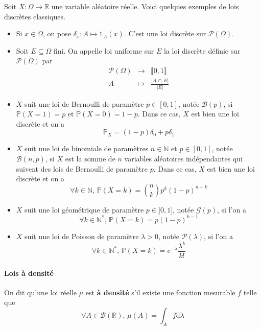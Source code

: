 	
	\begin{example}
		\label{261-1}
		Soit $X : \Omega \rightarrow \mathbb{R}$ une variable aléatoire réelle. Voici quelques exemples de lois discrètes classiques.
		\begin{itemize}
			\item \label{261-2} Si $x \in \Omega$, on pose $\delta_x : A \mapsto \mathbb{1}_A(x)$. C'est une loi discrète sur $\mathcal{P}(\Omega)$.
			\item Soit $E \subseteq \Omega$ fini. On appelle loi uniforme sur $E$ la loi discrète définie sur $\mathcal{P}(\Omega)$ par
			\[
			\begin{array}{ccc}
				\mathcal{P}(\Omega) &\rightarrow& \llbracket 0, 1 \rrbracket \\
				A &\mapsto& \frac{\vert A \, \cap \, E \vert}{\vert E \vert}
			\end{array}
			\]
			\item $X$ suit une loi de Bernoulli de paramètre $p \in [0,1]$, notée $\mathcal{B}(p)$, si $\mathbb{P}(X=1) = p$ et $\mathbb{P}(X=0)=1-p$. Dans ce cas, $X$ est bien une loi discrète et on a
			\[ \mathbb{P}_X = (1-p) \delta_0 + p \delta_1 \]
			\item $X$ suit une loi de binomiale de paramètres $n \in \mathbb{N}$ et $p \in [0,1]$, notée $\mathcal{B}(n, p)$, si $X$ est la somme de $n$ variables aléatoires indépendantes qui suivent des lois de Bernoulli de paramètre $p$. Dans ce cas, $X$ est bien une loi discrète et on a
			\[ \forall k \in \mathbb{N}, \, \mathbb{P}(X = k) = \binom{n}{k} p^k (1-p)^{n-k} \]
			\item $X$ suit une loi géométrique de paramètre $p \in ]0,1]$, notée $\mathcal{G}(p)$, si l'on a
			\[ \forall k \in \mathbb{N}^{*}, \, \mathbb{P}(X = k) = p(1-p)^{k-1} \]
			\item $X$ suit une loi de Poisson de paramètre $\lambda > 0$, notée $\mathcal{P}(\lambda)$, si l'on a
			\[ \forall k \in \mathbb{N}^{*}, \, \mathbb{P}(X = k) = e^{-\lambda} \frac{\lambda^k}{k!} \]
		\end{itemize}
	\end{example}
	
	\paragraph{Lois à densité}
	
	
	\begin{definition}
		On dit qu'une loi réelle $\mu$ est \textbf{à densité} s'il existe une fonction mesurable $f$ telle que
		\[ \forall A \in \mathcal{B}(\mathbb{R}), \, \mu(A) = \int_A f \mathrm{d}\lambda \]
	\end{definition}
	
